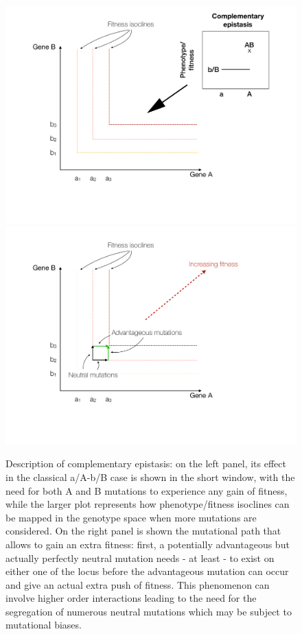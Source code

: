 \documentclass[11pt,onecolumn]{article}
\begin{document}
\begin{figure}[h!]
    \centering
    \includegraphics[scale=0.3,trim=3.2cm 4cm 3.2cm 1cm,clip]{Complementary epistasis.pdf}
    \includegraphics[scale=0.3,trim=3.2cm 4cm 6cm 1cm,clip]{Complementary epistasis_EvoTraj.pdf}
    \caption{Description of complementary epistasis: on the left panel, its effect in the classical a/A-b/B case is shown in the short window, with the need for both A and B mutations to experience any gain of fitness, while the larger plot represents how phenotype/fitness isoclines can be mapped in the genotype space when more mutations are considered. On the right panel is shown the mutational path that allows to gain an extra fitness: first, a potentially advantageous but actually perfectly neutral mutation needs - at least - to exist on either one of the locus before the advantageous mutation can occur and give an actual extra push of fitness. This phenomenon can involve higher order interactions leading to the need for the segregation of numerous neutral mutations which may be subject to mutational biases.}
    \label{fig:ComplementaryEpi}
\end{figure}
\end{document}
